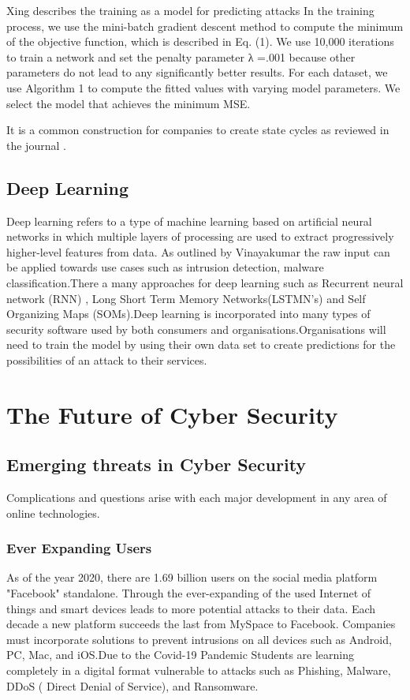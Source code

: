 \documentclass[journal]{IEEEtran}
\begin{document}
Xing describes the training as a model for predicting attacks In the training process, we use the mini-batch gradient descent method to compute the minimum of the objective function, which is described in Eq. (1). We use 10,000 iterations to train a network and set the penalty parameter λ =.001 because other parameters do not lead to any significantly better results. For each dataset, we use Algorithm 1 to compute the fitted values with varying model parameters. We select the model that achieves the minimum MSE.\cite{trainModel} 

It is a common construction for companies to create state cycles as reviewed in the journal .



\subsection{Deep Learning}\label{subsec:Deep-Learning}

Deep learning refers to a type of machine learning based on artificial neural networks in which multiple layers of processing are used to extract progressively higher-level features from data. As outlined by Vinayakumar the raw input can be applied towards use cases such as intrusion detection, malware classification.There a many approaches for deep learning such as Recurrent neural network (RNN) , Long Short Term Memory Networks(LSTMN's) and Self Organizing Maps (SOMs).Deep learning is incorporated into many types of security software used by both consumers and organisations.Organisations will need to train the model by using their own data set to create predictions for the possibilities of an attack to their services.




\cite{security} 


\section{The Future of  Cyber Security}


\subsection{Emerging threats in  Cyber Security}
Complications and questions arise with each major development in any area of online technologies.


\subsubsection{Ever Expanding Users  }
As of the year 2020, there are 1.69 billion users on the social media platform "Facebook" standalone. Through the ever-expanding of the used Internet of things and smart devices leads to more potential attacks to their data. Each decade a new platform succeeds the last from MySpace to Facebook. Companies must incorporate solutions to prevent intrusions on all devices such as  Android, PC, Mac, and iOS.Due to the Covid-19 Pandemic Students are learning completely in a digital format vulnerable to attacks such as Phishing, Malware, DDoS ( Direct Denial of Service), and Ransomware. 
\end{document}
